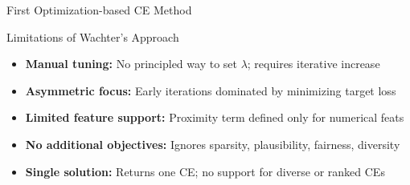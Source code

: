 \documentclass[10pt,compress,t,notes=noshow, xcolor=table]{beamer}
\begin{document}
\begin{frame}{First Optimization-based CE Method }
	
	


\end{frame}



\begin{frame}{Limitations of Wachter's Approach}
\vspace{0.2cm}

\begin{itemize}
  \item \textbf{Manual tuning:} No principled way to set \(\lambda\); requires iterative increase
  \item \textbf{Asymmetric focus:} Early iterations dominated by minimizing target loss
  \item \textbf{Limited feature support:} Proximity term defined only for numerical feats
  \item \textbf{No additional objectives:} Ignores sparsity, plausibility, fairness, diversity
  \item \textbf{Single solution:} Returns one CE; no support for diverse or ranked CEs
\end{itemize}

\end{frame}
\end{document}
